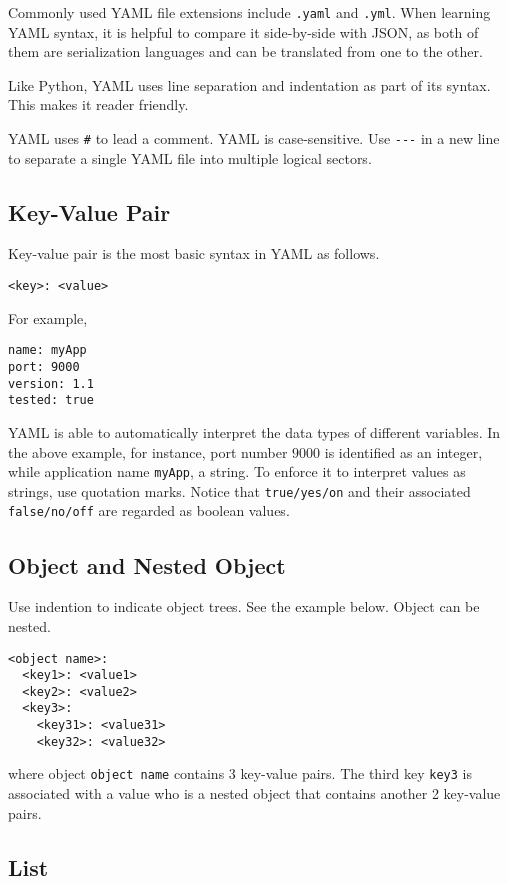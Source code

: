 Commonly used YAML file extensions include \verb|.yaml| and \verb|.yml|. When learning YAML syntax, it is helpful to compare it side-by-side with JSON, as both of them are serialization languages and can be translated from one to the other.

Like Python, YAML uses line separation and indentation as part of its syntax. This makes it reader friendly.

YAML uses \verb|#| to lead a comment. YAML is case-sensitive. Use \verb|---| in a new line to separate a single YAML file into multiple logical sectors.

\subsection{Key-Value Pair}

Key-value pair is the most basic syntax in YAML as follows.
\begin{lstlisting}
<key>: <value>
\end{lstlisting}
For example,
\begin{lstlisting}
name: myApp
port: 9000
version: 1.1
tested: true
\end{lstlisting}

YAML is able to automatically interpret the data types of different variables. In the above example, for instance, port number $9000$ is identified as an integer, while application name \verb|myApp|, a string. To enforce it to interpret values as strings, use quotation marks. Notice that \verb|true/yes/on| and their associated \verb|false/no/off| are regarded as boolean values.


\subsection{Object and Nested Object}

Use indention to indicate object trees. See the example below. Object can be nested.
\begin{lstlisting}
<object name>:
  <key1>: <value1>
  <key2>: <value2>
  <key3>:
    <key31>: <value31>
    <key32>: <value32>
\end{lstlisting}
where object \verb|object name| contains 3 key-value pairs. The third key \verb|key3| is associated with a value who is a nested object that contains another 2 key-value pairs.

\subsection{List}

